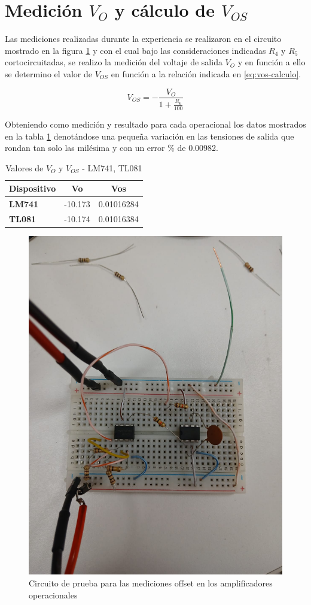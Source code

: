 \section{Medición $V_O$ y cálculo de $V_{OS}$ }

Las mediciones realizadas durante la experiencia se realizaron en el circuito mostrado en la figura \ref{fig:opam-offset} y con el cual bajo las consideraciones indicadas $R_4$ y $R_5$ cortocircuitadas, se realizo la medición del voltaje de salida $V_O$ y en función a ello se determino el valor de $V_{OS}$ en función a la relación indicada en \ref{eq:vos-calculo}.

\begin{equation}
	V_{OS} = -\frac{V_O}{1 + \frac{R_6}{100}}
	\label{eq:vos-calculo}
\end{equation}

Obteniendo como medición y resultado para cada operacional los datos mostrados en la tabla \ref{tab:mediciones-vo-vos} denotándose una pequeña variación en las tensiones de salida que rondan tan solo las milésima y con un error \% de 0.00982. 

\begin{table}[]
	\begin{tabular}{|l|l|l|}
		\hline
		\multicolumn{1}{|c|}{\textbf{Dispositivo}} & \multicolumn{1}{c|}{\textbf{Vo}} & \multicolumn{1}{c|}{\textbf{Vos}} \\ \hline
		\textbf{LM741}                             & -10.173                          & 0.01016284                        \\ \hline
		\textbf{TL081}                             & -10.174                          & 0.01016384                        \\ \hline
	\end{tabular}
	\caption{Valores de $V_O$ y $V_{OS}$ - LM741, TL081}
	\label{tab:mediciones-vo-vos}
\end{table}

\begin{figure}[h]
	\centering
	\includegraphics[width=0.5\linewidth]{media/opam-offset}
	\caption{Circuito de prueba para las mediciones offset en los amplificadores operacionales}
	\label{fig:opam-offset}
\end{figure}



